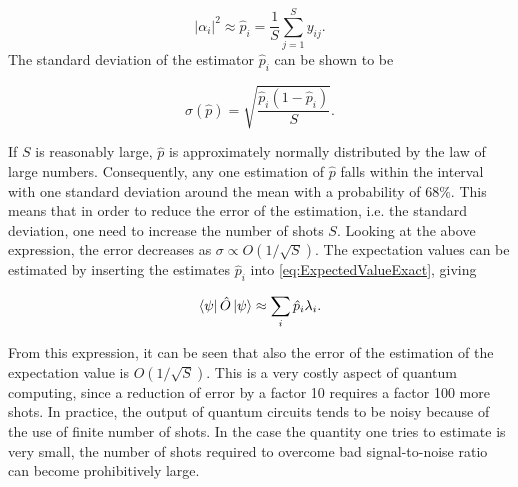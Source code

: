 \begin{equation}
    |\alpha_i|^2 \approx \hat{p}_i = \frac{1}{S}\sum_{j=1}^S y_{ij}.
\end{equation}
The standard deviation of the estimator $\hat{p}_i$ can be shown to be

\begin{equation}
    \sigma(\hat{p}) = \sqrt{\frac{\hat{p}_i(1-\hat{p}_i)}{S}}.
\end{equation}


If $S$ is reasonably large, $\hat{p}$ is approximately normally distributed by the law of large numbers. Consequently, any one estimation of $\hat{p}$ falls within the interval with one standard deviation around the mean with a probability of $68\%$. This means that in order to reduce the error of the estimation, i.e. the standard deviation, one need to increase the number of shots $S$. Looking at the above expression, the error decreases as $\sigma \propto O(1/\sqrt{S})$. The expectation values can be estimated by inserting the estimates $\hat{p}_i$ into \autoref{eq:ExpectedValueExact}, giving

\begin{equation}\label{eq:ExpectedValueEstimate}
    \bra{\psi}\hat{O}\ket{\psi} \approx \sum_{i} \hat{p}_i\lambda_i.
\end{equation}

From this expression, it can be seen that also the error of the estimation of the expectation value is $O(1/\sqrt{S})$. This is a very costly aspect of quantum computing, since a reduction of error by a factor 10  requires a factor 100 more shots. In practice, the output of quantum circuits tends to be noisy because of the use of finite number of shots. In the case the quantity one tries to estimate is very small, the number of shots required to overcome bad signal-to-noise ratio can become prohibitively large.



